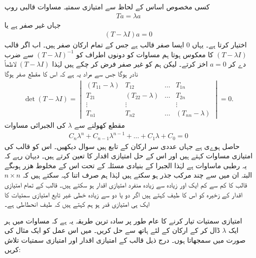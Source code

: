 کسی مخصوص اساس کے لحاظ سے امتیازی سمتیہ مساوات قالبی روپ 
\begin{align}
	Ta = \lambda a
\end{align}
جہاں  غیر صفر ہے یا
\begin{align}
	(T-\lambda I)a = \num{0}
\end{align}
اختیار کرتا ہے۔ یہاں \num{0} ایسا صفر قالب ہے جس کے تمام ارکان صفر ہیں۔ اب اگر قالب \((T-\lambda I)\) کا معکوس ہوتا ہم مساوات  کو دونوں اطراف کو \((T-\lambda I)^{-1}\) سے ضرب دے کر \(a=0\) اخز کرتے۔ لیکن ہم  کو غیر صفر فرض کر چکے ہیں لہٰذا \((T-\lambda I)\) لاظماً نادر ہوگا جس سے مراد یہ ہے کہ اس کا مقطع صفر ہوگا
\begin{align}
	\det(T-\lambda I)=
	\begin{vmatrix}
		(T_{11}-\lambda) & T_{12} & \dots & T_{1n}\\
		T_{21} & (T_{22}-\lambda) & \dots & T_{2n}\\
		\vdots & \vdots & & \vdots\\
		T_{n1} & T_{n2} & \dots & (T_{nn}-\lambda)
	\end{vmatrix}
		= 0.
\end{align}
مقطع کھولنے سے \(\lambda\) کی الجبرائی مساوات
\begin{align}
	C_n\lambda^{n}+C_{n-1}\lambda^{n-1}+\dots+C_1\lambda+C_0 = 0
\end{align}
حاصل ہوےی ہے جہاں عددی سر  ارکان  کے تابع ہیں سوال  دیکھیں۔ اس کو قالب کی امتیازی مساوات کہتے ہیں اور اس کے حل امتیازی اقدار کا تعین کرتے ہیں۔ دیہان رہے کہ یہ  رطبی ماساوات ہے لہٰذا الجبرا کے بنیادی مسئلہ کے تحت اس کے  مخلوط ھزر ہوںگے البتہ ان میں سے چند مرکب جذر ہو سکتے ہیں لہٰذا ہم صرف اتنا کہہ سکتے ہیں کہ \(n \times n\) قالب کا کم سے کم ایک اور زیادہ سے زیادہ  منفرد امتیازی اقدار ہو سکتے ہیں۔ قالب کے تمام امتیازی اقدار کے زخیرہ کو اس کا طیف کہتے ہیں اگر دو یا دو سے زیادہ خطی غیر تابع امتیازی سمتیات کا ایک ہی امتیازی قدر ہو ہم کہتے ہیں کہ طیف انحطاطی ہے۔

امتیازی سمتیات تیار کرنے کا عام طور پر سادہ ترین طریقہ یہ ہے کہ مساوات  میں ہر ایک \(\lambda\) ڈال کر  کے ارکان کے لئے ہاتھ سے حل کریں۔ میں اس عمل کو ایک مثال کی صورت میں سمجھاتا ہوں۔
درج ذیل قالب کے امتیازی اقدار اور امتیازی سمتیات تلاش کریں:

